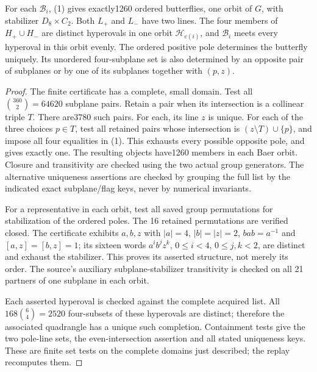 \documentclass[11pt]{article}
\newcommand{\orb}{\mathcal B}\newcommand{\hyp}{\mathcal H}
\begin{document}
\begin{lemma}
For each $\orb_i$, (1) gives exactly1260 ordered butterflies, one orbit of
$G$, with stabilizer $D_8\times C_2$. Both $L_+$ and $L_-$ have two lines.
The four members of $H_+\cup H_-$ are distinct hyperovals in one orbit
$\hyp_{e(i)}$, and $\orb_i$ meets every hyperoval in this orbit evenly.
The ordered positive pole determines the butterfly uniquely. Its unordered
four-subplane set is also determined by an opposite pair of subplanes or by
one of its subplanes together with $(p,z)$.
\end{lemma}
\begin{proof}
The finite certificate has a complete, small domain. Test all
$\binom{360}{2}=64620$ subplane pairs. Retain a pair when its intersection
is a collinear triple $T$. There are3780 such pairs. For each, its line $z$
is unique. For each of the three choices $p\in T$, test all retained pairs
whose intersection is $(z\setminus T)\cup\{p\}$, and impose all four
equalities in (1). This exhausts every possible opposite pole, and gives
exactly one. The resulting objects have1260 members in each Baer orbit.
Closure and transitivity are checked using the two actual group generators.
The alternative uniqueness assertions are checked by grouping the full list
by the indicated exact subplane/flag keys, never by numerical invariants.

For a representative in each orbit, test all saved group permutations for
stabilization of the ordered poles. The 16 retained permutations are verified
closed. The certificate exhibits $a,b,z$ with $|a|=4$, $|b|=|z|=2$,
$bab=a^{-1}$ and $[a,z]=[b,z]=1$; its sixteen words
$a^ib^jz^k$, $0\leq i<4$, $0\leq j,k<2$, are distinct and exhaust the
stabilizer. This proves its asserted structure, not merely its order.
The source's auxiliary subplane-stabilizer transitivity is checked on all
21 partners of one subplane in each orbit.

Each asserted hyperoval is checked against the complete acquired list.
All $168\binom64=2520$ four-subsets of these hyperovals are distinct;
therefore the associated quadrangle has a unique such completion.
Containment tests give the two pole-line sets, the even-intersection
assertion and all stated uniqueness keys. These are finite set tests on the
complete domains just described; the replay recomputes them.
\end{proof}
\end{document}

